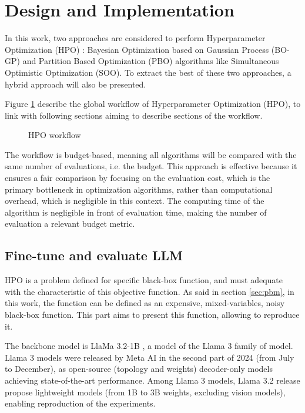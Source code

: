 \documentclass[runningheads]{llncs}
\begin{document}
\section{Design and Implementation}
\label{sec:methodo}
In this work, two approaches are considered to perform Hyperparameter Optimization (HPO) : 
Bayesian Optimization based on Gaussian Process (BO-GP) and  Partition Based Optimization (PBO) algorithms like Simultaneous Optimistic Optimization (SOO)\cite{munos_optimistic_2011}. To extract the best of these two approaches, a hybrid approach will also be presented.

Figure \ref{fig:workflow} describe the global workflow of Hyperparameter Optimization (HPO), to link with following sections aiming to describe sections of the workflow. 

\begin{figure}[h!]
    \centering
    \resizebox{\textwidth}{!}{
        
    }
    \caption{HPO workflow}
    \label{fig:workflow}
\end{figure}

The workflow is budget-based, meaning all algorithms will be compared with the same number of evaluations, i.e. the budget. This approach is effective because it ensures a fair comparison by focusing on the evaluation cost, which is the primary bottleneck in optimization algorithms, rather than computational overhead, which is negligible in this context. The computing time of the algorithm is negligible in front of evaluation time, making the number of evaluation a relevant budget metric. 

\subsection{Fine-tune and evaluate LLM}
\label{sec:llm}
HPO is a problem defined for specific black-box function, and must adequate with the characteristic of this objective function. As said in section \ref{sec:pbm}, in this work, the function can be defined as an expensive, mixed-variables, noisy black-box function. This part aims to present this function, allowing to reproduce it. 

The backbone model is LlaMa 3.2-1B \cite{grattafiori_llama_2024}, a model of the Llama 3 family of model. Llama 3 models were released by Meta AI in the second part of 2024 (from July to December), as open-source (topology and weights) decoder-only models achieving state-of-the-art performance. Among Llama 3 models, Llama 3.2 release propose lightweight models (from 1B to 3B weights, excluding vision models), enabling reproduction of the experiments. 
\end{document}

